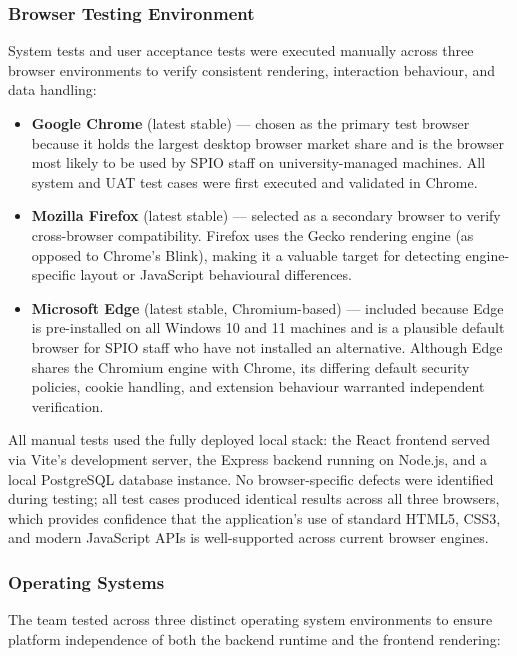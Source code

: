 \subsubsection*{Browser Testing Environment}

System tests and user acceptance tests were executed manually across three browser environments to verify consistent rendering, interaction behaviour, and data handling:

\begin{itemize}
    \item \textbf{Google Chrome} (latest stable) --- chosen as the primary test browser because it holds the largest desktop browser market share and is the browser most likely to be used by SPIO staff on university-managed machines. All system and UAT test cases were first executed and validated in Chrome.
    \item \textbf{Mozilla Firefox} (latest stable) --- selected as a secondary browser to verify cross-browser compatibility. Firefox uses the Gecko rendering engine (as opposed to Chrome's Blink), making it a valuable target for detecting engine-specific layout or JavaScript behavioural differences.
    \item \textbf{Microsoft Edge} (latest stable, Chromium-based) --- included because Edge is pre-installed on all Windows 10 and 11 machines and is a plausible default browser for SPIO staff who have not installed an alternative. Although Edge shares the Chromium engine with Chrome, its differing default security policies, cookie handling, and extension behaviour warranted independent verification.
\end{itemize}

\noindent All manual tests used the fully deployed local stack: the React frontend served via Vite's development server, the Express backend running on Node.js, and a local PostgreSQL database instance. No browser-specific defects were identified during testing; all test cases produced identical results across all three browsers, which provides confidence that the application's use of standard HTML5, CSS3, and modern JavaScript APIs is well-supported across current browser engines.

\subsubsection*{Operating Systems}

The team tested across three distinct operating system environments to ensure platform independence of both the backend runtime and the frontend rendering:

